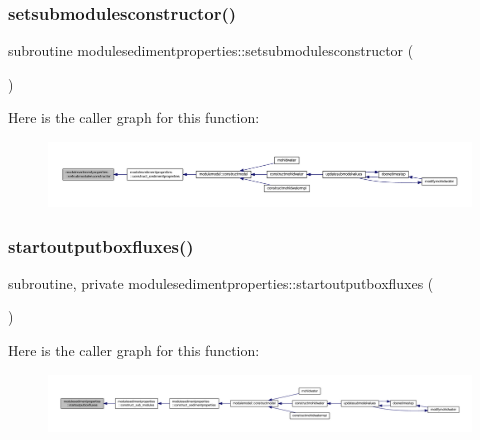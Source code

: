 \subsubsection{\texorpdfstring{setsubmodulesconstructor()}{setsubmodulesconstructor()}}
{\footnotesize\ttfamily subroutine modulesedimentproperties\+::setsubmodulesconstructor (\begin{DoxyParamCaption}{ }\end{DoxyParamCaption})\hspace{0.3cm}{\ttfamily [private]}}

Here is the caller graph for this function\+:\nopagebreak
\begin{figure}[H]
\begin{center}
\leavevmode
\includegraphics[width=350pt]{namespacemodulesedimentproperties_acc4f3e2fa34ac7c083b5c86382b68a59_icgraph}
\end{center}
\end{figure}
\mbox{\label{namespacemodulesedimentproperties_a003fd1b9c4a46c432214de1d337ed97a}} 
\subsubsection{\texorpdfstring{startoutputboxfluxes()}{startoutputboxfluxes()}}
{\footnotesize\ttfamily subroutine, private modulesedimentproperties\+::startoutputboxfluxes (\begin{DoxyParamCaption}{ }\end{DoxyParamCaption})\hspace{0.3cm}{\ttfamily [private]}}

Here is the caller graph for this function\+:\nopagebreak
\begin{figure}[H]
\begin{center}
\leavevmode
\includegraphics[width=350pt]{namespacemodulesedimentproperties_a003fd1b9c4a46c432214de1d337ed97a_icgraph}
\end{center}
\end{figure}
\mbox{\label{namespacemodulesedimentproperties_a9bc2949e84269f97fba7dd6633e221d9}} 
